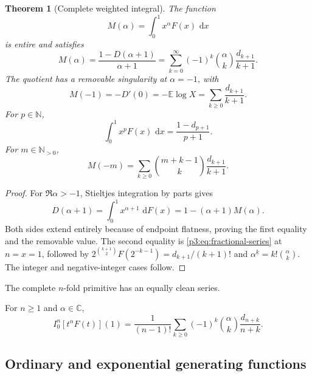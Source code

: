 \documentclass[11pt,oneside]{article}
\newtheorem{theorem}{Theorem}[section]
\theoremstyle{definition}
\theoremstyle{remark}
\newcommand{\E}{\mathbb E}
\newcommand{\C}{\mathbb C}
\newcommand{\N}{\mathbb N}
\newcommand{\dd}{\,\mathrm d}
\newcommand{\fall}[2]{#1^{\underline{#2}}}
\newcommand{\1}{\mathbf 1}
\begin{document}
\begin{theorem}[Complete weighted integral]
\label{p3:thm:complete-M}
The function
\begin{equation}
 M(\alpha)=\int_0^1x^\alpha F(x)\,\dd x                       \label{p3:eq:M-def}
\end{equation}
is entire and satisfies
\begin{equation}
 \boxed{
 M(\alpha)=\frac{1-D(\alpha+1)}{\alpha+1}
 =\sum_{k=0}^{\infty}(-1)^k\binom\alpha k\frac{d_{k+1}}{k+1}.}
 \label{p3:eq:M-master}
\end{equation}
The quotient has a removable singularity at $\alpha=-1$, with
\begin{equation}
 M(-1)=-D'(0)=-\E\log X=\sum_{k\ge0}\frac{d_{k+1}}{k+1}.      \label{p3:eq:M-minus-one}
\end{equation}
For $p\in\N$,
\begin{equation}
 \int_0^1x^pF(x)\,\dd x=\frac{1-d_{p+1}}{p+1}.               \label{p3:eq:M-integer}
\end{equation}
For $m\in\N_{>0}$,
\begin{equation}
 M(-m)=\sum_{k\ge0}\binom{m+k-1}{k}\frac{d_{k+1}}{k+1}.      \label{p3:eq:M-negative}
\end{equation}
\end{theorem}

\begin{proof}
For $\Re\alpha>-1$, Stieltjes integration by parts gives
\[
 D(\alpha+1)=\int_0^1x^{\alpha+1}\,\dd F(x)
 =1-(\alpha+1)M(\alpha).
\]
Both sides extend entirely because of endpoint flatness, proving the first equality and the
removable value.  The second equality is \eqref{p3:eq:fractional-series} at $n=x=1$, followed by
$2^{\binom{k+1}{2}}F(2^{-k-1})=d_{k+1}/(k+1)!$ and
$\fall\alpha k=k!\binom\alpha k$.  The integer and negative-integer cases follow.
\end{proof}

The complete $n$-fold primitive has an equally clean series.

\begin{corollary}
For $n\ge1$ and $\alpha\in\C$,
\begin{equation}
 \boxed{
 I_0^n[t^\alpha F(t)](1)
 =\frac1{(n-1)!}\sum_{k\ge0}(-1)^k\binom\alpha k
 \frac{d_{n+k}}{n+k}.}
 \label{p3:eq:complete-nfold}
\end{equation}
\end{corollary}

\subsection{Ordinary and exponential generating functions}
\end{document}
